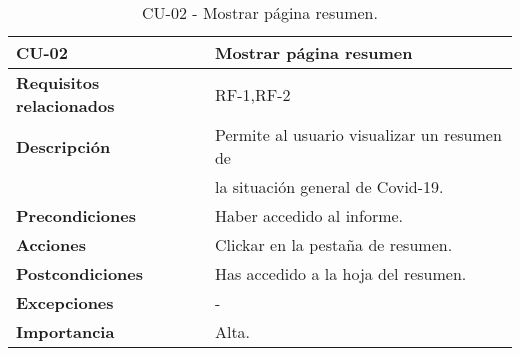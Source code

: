 \begin{table}[ht!]
    \centering
    \resizebox{15cm}{!} {
    \begin{tabular}{|l|l|}
    \hline
         \textbf{CU-02}     &  \textbf{Mostrar página resumen} \\ \hline
         \textbf{Requisitos relacionados}       & RF-1,RF-2 \\ \hline
         \textbf{Descripción}    & Permite al usuario visualizar un resumen de\\& la situación general de Covid-19. \\ \hline   
         \textbf{Precondiciones}      & Haber accedido al informe.\\ \hline
         \textbf{Acciones}      &  Clickar en la pestaña de resumen.\\ \hline
         \textbf{Postcondiciones}       & Has accedido a la hoja del resumen. \\ \hline
         \textbf{Excepciones}       & -\\ \hline
         \textbf{Importancia}   &Alta. \\
         \hline
    \end{tabular}}
    \caption{CU-02 - Mostrar página resumen.}
    \label{tab:my_label}
\end{table}

